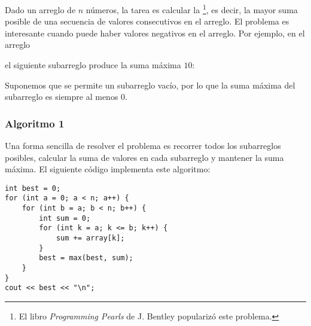 Dado un arreglo de $n$ números,
la tarea es calcular la
\footnote {El libro \emph{Programming Pearls}
\cite{ben86} de J. Bentley popularizó este problema.}, 
es decir, la mayor suma posible de una secuencia de 
valores consecutivos en el arreglo.
El problema es interesante cuando puede haber
valores negativos en el arreglo.
Por ejemplo, en el arreglo
\begin{center}
\end{center}
\begin{samepage}
el siguiente subarreglo produce la suma máxima $10$:
\begin{center}
\end{center}
\end{samepage}

Suponemos que se permite un subarreglo vacío,
por lo que la suma máxima del subarreglo es siempre al menos $0$.
\subsubsection{Algoritmo 1}

Una forma sencilla de resolver el problema
es recorrer todos los subarreglos posibles,
calcular la suma de valores en cada subarreglo y mantener
la suma máxima.
El siguiente código implementa este algoritmo:

\begin{lstlisting}
int best = 0;
for (int a = 0; a < n; a++) {
    for (int b = a; b < n; b++) {
        int sum = 0;
        for (int k = a; k <= b; k++) {
            sum += array[k];
        }
        best = max(best, sum);
    }
}
cout << best << "\n";
\end{lstlisting}

